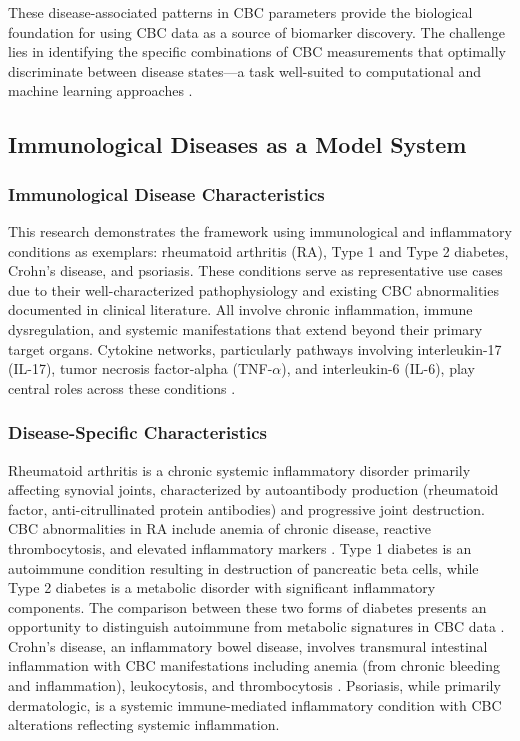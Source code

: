 \documentclass[12pt,a4paper]{article}
\begin{document}
These disease-associated patterns in CBC parameters provide the biological foundation for using CBC data as a source of biomarker discovery. The challenge lies in identifying the specific combinations of CBC measurements that optimally discriminate between disease states---a task well-suited to computational and machine learning approaches \cite{ref21,ref22}.

\subsection{Immunological Diseases as a Model System}

\subsubsection{Immunological Disease Characteristics}

This research demonstrates the framework using immunological and inflammatory conditions as exemplars: rheumatoid arthritis (RA), Type 1 and Type 2 diabetes, Crohn's disease, and psoriasis. These conditions serve as representative use cases due to their well-characterized pathophysiology and existing CBC abnormalities documented in clinical literature. All involve chronic inflammation, immune dysregulation, and systemic manifestations that extend beyond their primary target organs. Cytokine networks, particularly pathways involving interleukin-17 (IL-17), tumor necrosis factor-alpha (TNF-$\alpha$), and interleukin-6 (IL-6), play central roles across these conditions \cite{ref16,ref25,ref26}.

\subsubsection{Disease-Specific Characteristics}

Rheumatoid arthritis is a chronic systemic inflammatory disorder primarily affecting synovial joints, characterized by autoantibody production (rheumatoid factor, anti-citrullinated protein antibodies) and progressive joint destruction. CBC abnormalities in RA include anemia of chronic disease, reactive thrombocytosis, and elevated inflammatory markers \cite{ref14,ref15,ref25}. Type 1 diabetes is an autoimmune condition resulting in destruction of pancreatic beta cells, while Type 2 diabetes is a metabolic disorder with significant inflammatory components. The comparison between these two forms of diabetes presents an opportunity to distinguish autoimmune from metabolic signatures in CBC data \cite{ref10}. Crohn's disease, an inflammatory bowel disease, involves transmural intestinal inflammation with CBC manifestations including anemia (from chronic bleeding and inflammation), leukocytosis, and thrombocytosis \cite{ref16}. Psoriasis, while primarily dermatologic, is a systemic immune-mediated inflammatory condition with CBC alterations reflecting systemic inflammation.
\end{document}
